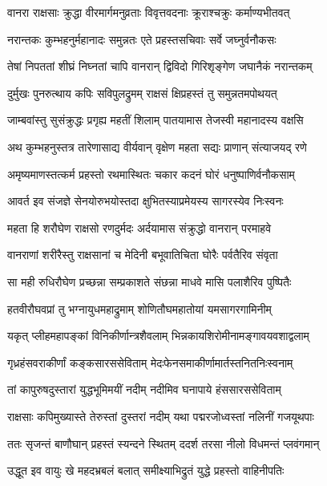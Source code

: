 \twolineshloka
{वानरा राक्षसाः क्रुद्धा वीरमार्गमनुव्रताः}
{विवृत्तवदनाः क्रूराश्चक्रुः कर्माण्यभीतवत्} %

\twolineshloka
{नरान्तकः कुम्भहनुर्महानादः समुन्नतः}
{एते प्रहस्तसचिवाः सर्वे जघ्नुर्वनौकसः} %

\twolineshloka
{तेषां निपततां शीघ्रं निघ्नतां चापि वानरान्}
{द्विविदो गिरिशृङ्गेण जघानैकं नरान्तकम्} %

\twolineshloka
{दुर्मुखः पुनरुत्थाय कपिः सविपुलद्रुमम्}
{राक्षसं क्षिप्रहस्तं तु समुन्नतमपोथयत्} %

\twolineshloka
{जाम्बवांस्तु सुसंक्रुद्धः प्रगृह्य महतीं शिलाम्}
{पातयामास तेजस्वी महानादस्य वक्षसि} %

\twolineshloka
{अथ कुम्भहनुस्तत्र तारेणासाद्य वीर्यवान्}
{वृक्षेण महता सद्यः प्राणान् संत्याजयद् रणे} %

\twolineshloka
{अमृष्यमाणस्तत्कर्म प्रहस्तो रथमास्थितः}
{चकार कदनं घोरं धनुष्पाणिर्वनौकसाम्} %

\twolineshloka
{आवर्त इव संजज्ञे सेनयोरुभयोस्तदा}
{क्षुभितस्याप्रमेयस्य सागरस्येव निःस्वनः} %

\twolineshloka
{महता हि शरौघेण राक्षसो रणदुर्मदः}
{अर्दयामास संक्रुद्धो वानरान् परमाहवे} %

\twolineshloka
{वानराणां शरीरैस्तु राक्षसानां च मेदिनी}
{बभूवातिचिता घोरैः पर्वतैरिव संवृता} %

\twolineshloka
{सा मही रुधिरौघेण प्रच्छन्ना सम्प्रकाशते}
{संछन्ना माधवे मासि पलाशैरिव पुष्पितैः} %

\twolineshloka
{हतवीरौघवप्रां तु भग्नायुधमहाद्रुमाम्}
{शोणितौघमहातोयां यमसागरगामिनीम्} %

\twolineshloka
{यकृत् प्लीहमहापङ्कां विनिकीर्णान्त्रशैवलाम्}
{भिन्नकायशिरोमीनामङ्गावयवशाद्वलाम्} %

\twolineshloka
{गृध्रहंसवराकीर्णां कङ्कसारससेविताम्}
{मेदःफेनसमाकीर्णामार्तस्तनितनिःस्वनाम्} %

\twolineshloka
{तां कापुरुषदुस्तारां युद्धभूमिमयीं नदीम्}
{नदीमिव घनापाये हंससारससेविताम्} %

\twolineshloka
{राक्षसाः कपिमुख्यास्ते तेरुस्तां दुस्तरां नदीम्}
{यथा पद्मरजोध्वस्तां नलिनीं गजयूथपाः} %

\twolineshloka
{ततः सृजन्तं बाणौघान् प्रहस्तं स्यन्दने स्थितम्}
{ददर्श तरसा नीलो विधमन्तं प्लवंगमान्} %

\twolineshloka
{उद्धूत इव वायुः खे महदभ्रबलं बलात्}
{समीक्ष्याभिद्रुतं युद्धे प्रहस्तो वाहिनीपतिः} %

